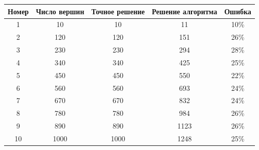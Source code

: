 \documentclass[14pt]{article}
\begin{document}
		\centering
			\begin{tabular}{|c|c|c|c|c|}
			\hline
			\multicolumn{1}{|l|}{Номер} & \multicolumn{1}{l|}{Число вершин} & \multicolumn{1}{l|}{Точное решение} & \multicolumn{1}{l|}{Решение алгоритма} & \multicolumn{1}{l|}{Ошибка} \\ \hline
1                           & 10                       & 10                                  & 11                                     & 10\%                        \\ \hline
2                           & 120                      & 120                                 & 151                                    & 26\%                        \\ \hline
3                           & 230                      & 230                                 & 294                                    & 28\%                        \\ \hline
4                           & 340                      & 340                                 & 425                                    & 25\%                        \\ \hline
5                           & 450                      & 450                                 & 550                                    & 22\%                        \\ \hline
6                           & 560                      & 560                                 & 693                                    & 24\%                        \\ \hline
7                           & 670                      & 670                                 & 832                                    & 24\%                        \\ \hline
8                           & 780                      & 780                                 & 984                                    & 26\%                        \\ \hline
9                           & 890                      & 890                                 & 1123                                   & 26\%                        \\ \hline
10                          & 1000                     & 1000                                & 1248                                   & 25\%                        \\ \hline
			\end{tabular}
			
			$                 $
			
\end{document}
